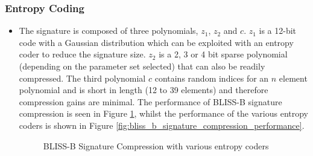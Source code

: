 \subsubsection{Entropy Coding}
\begin{itemize}
\item The signature is composed of three polynomials, $z_1$, $z_2$ and $c$. $z_1$ is a 12-bit code with a Gaussian distribution which can be exploited with an entropy coder to reduce the signature size. $z_2$ is a 2, 3 or 4 bit sparse polynomial (depending on the parameter set selected) that can also be readily compressed. The third polynomial $c$ contains random indices for an $n$ element polynomial and is short in length (12 to 39 elements) and therefore compression gains are minimal. The performance of BLISS-B signature compression is seen in Figure \ref{fig:bliss_b_signature_compression}, whilst the performance of the various entropy coders is shown in Figure \ref{fig:bliss_b_signature_compression_performance}.

\pgfplotsset{compat=1.13,width=14cm,height=8cm}
\begin{figure}[ht!]
\centering
{}
\caption{BLISS-B Signature Compression with various entropy coders}
\label{fig:bliss_b_signature_compression}
\end{figure}


\end{itemize}

